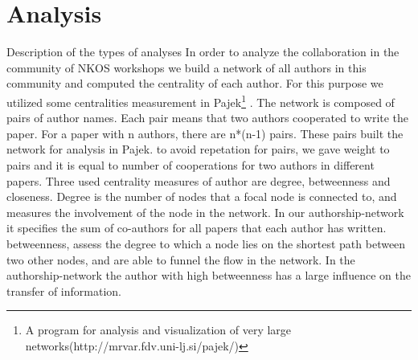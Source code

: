 \documentclass[runningheads,a4paper]{llncs}
\begin{document}
\section{Analysis}\label{analysis}
Description of the types of analyses
In order to analyze the collaboration in the community of NKOS workshops we build a network of all authors in this community and computed the centrality of each author. For this purpose we utilized some centralities measurement in Pajek\footnote{A program for analysis and visualization of very large networks(http://mrvar.fdv.uni-lj.si/pajek/)} . The network is composed  of pairs of author names. Each pair means that two authors cooperated to write the paper. For a paper with n authors, there are n*(n-1) pairs. These pairs built the network for analysis in Pajek. to avoid repetation for pairs, we gave weight to pairs and it is equal to number of cooperations for two authors in different papers. 
Three used centrality measures of author are degree, betweenness and closeness. Degree is the number of nodes that a focal node is connected to, and measures the involvement of the node in the network\cite{Opsahl2010}. In our authorship-network it specifies the sum of co-authors for all papers that each author has written. betweenness, assess the degree to which a node lies on the shortest path between two other nodes, and are able to funnel the flow in the network\cite{Opsahl2010}. In the authorship-network the author with high betweenness has a large influence on the transfer of information. 

\end{document}
